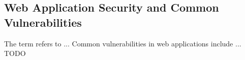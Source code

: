 \subsection{Web Application Security and Common Vulnerabilities}
The term  refers to ... 
Common vulnerabilities in web applications include ... \cite{OWASP/Top10}
{\color{red}TODO}
